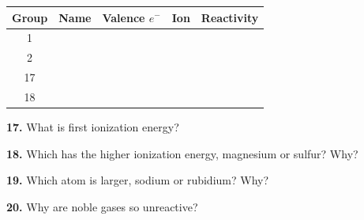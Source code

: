 \begin{tabular}{|c|p{3.5cm}|c|c|p{4cm}|}\hline
Group & Name & Valence $e^-$ & Ion & Reactivity\\\hline
1 & & & & \\\hline 2 & & & & \\\hline 17 & & & & \\\hline 18 & & & & \\\hline
\end{tabular}

\textbf{17.} What is first ionization energy?\ans

\textbf{18.} Which has the higher ionization energy, magnesium or sulfur? Why?\ans[2]

\textbf{19.} Which atom is larger, sodium or rubidium? Why?\ans[2]

\textbf{20.} Why are noble gases so unreactive?\ans

